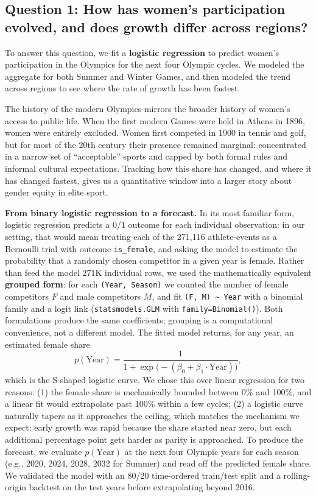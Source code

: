 \documentclass[11pt]{article}
\begin{document}
\subsection*{Question 1: How has women's participation evolved, and does growth differ across regions?}

To answer this question, we fit a \textbf{logistic regression} to predict women's participation in the Olympics for the next four Olympic cycles. We modeled the aggregate for both Summer and Winter Games, and then modeled the trend across regions to see where the rate of growth has been fastest.

The history of the modern Olympics mirrors the broader history of women's access to public life. When the first modern Games were held in Athens in 1896, women were entirely excluded. Women first competed in 1900 in tennis and golf, but for most of the 20th century their presence remained marginal: concentrated in a narrow set of ``acceptable'' sports and capped by both formal rules and informal cultural expectations. Tracking how this share has changed, and where it has changed fastest, gives us a quantitative window into a larger story about gender equity in elite sport.

\textbf{From binary logistic regression to a forecast.} In its most familiar form, logistic regression predicts a 0/1 outcome for each individual observation: in our setting, that would mean treating each of the 271{,}116 athlete-events as a Bernoulli trial with outcome \texttt{is\_female}, and asking the model to estimate the probability that a randomly chosen competitor in a given year is female. Rather than feed the model 271K individual rows, we used the mathematically equivalent \textbf{grouped form}: for each \texttt{(Year, Season)} we counted the number of female competitors $F$ and male competitors $M$, and fit \texttt{(F, M) \textasciitilde{} Year} with a binomial family and a logit link (\texttt{statsmodels.GLM} with \texttt{family=Binomial()}). Both formulations produce the same coefficients; grouping is a computational convenience, not a different model. The fitted model returns, for any year, an estimated female share
\[
p(\text{Year}) = \frac{1}{1 + \exp\!\bigl(-(\beta_0 + \beta_1 \cdot \text{Year})\bigr)},
\]
which is the S-shaped logistic curve. We chose this over linear regression for two reasons: (1) the female share is mechanically bounded between 0\% and 100\%, and a linear fit would extrapolate past 100\% within a few cycles; (2) a logistic curve naturally tapers as it approaches the ceiling, which matches the mechanism we expect: early growth was rapid because the share started near zero, but each additional percentage point gets harder as parity is approached. To produce the forecast, we evaluate $p(\text{Year})$ at the next four Olympic years for each season (e.g., 2020, 2024, 2028, 2032 for Summer) and read off the predicted female share. We validated the model with an 80/20 time-ordered train/test split and a rolling-origin backtest on the test years before extrapolating beyond 2016.
\end{document}
